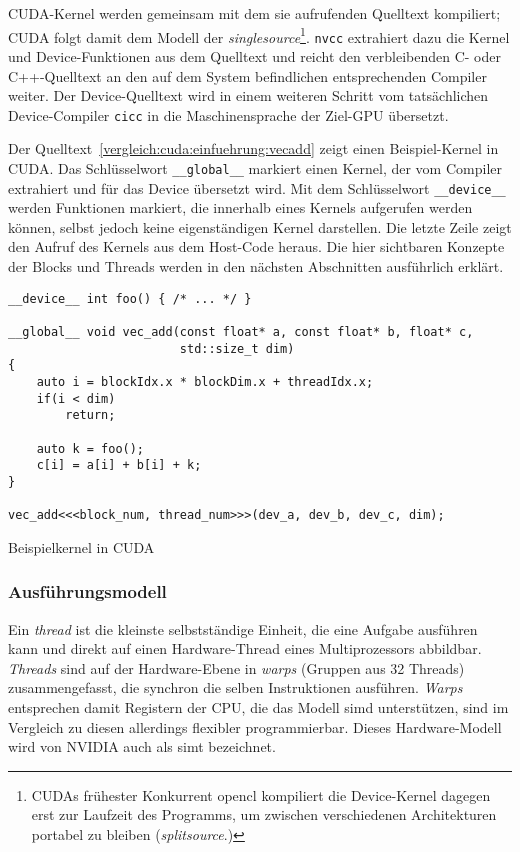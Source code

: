 CUDA-Kernel werden gemeinsam mit dem sie aufrufenden Quelltext kompiliert; CUDA
folgt damit dem Modell der \textit{\gls{singlesource}}\footnote{CUDAs frühester
Konkurrent \gls{opencl} kompiliert die Device-Kernel dagegen erst zur Laufzeit
des Programms, um zwischen verschiedenen Architekturen portabel zu bleiben
(\textit{\gls{splitsource}}.)}. \texttt{nvcc} extrahiert dazu die Kernel und
Device-Funktionen aus dem Quelltext und reicht den verbleibenden C- oder
C++-Quelltext an den auf dem System befindlichen entsprechenden Compiler
weiter. Der Device-Quelltext wird in einem weiteren Schritt vom tatsächlichen
Device-Compiler \texttt{cicc} in die Maschinensprache der Ziel-GPU übersetzt.

Der Quelltext~\ref{vergleich:cuda:einfuehrung:vecadd} zeigt einen
Beispiel-Kernel in CUDA. Das Schlüsselwort \texttt{\_\_global\_\_} markiert
einen Kernel, der vom Compiler extrahiert und für das Device übersetzt wird. Mit
dem Schlüsselwort \texttt{\_\_device\_\_} werden Funktionen markiert, die
innerhalb eines Kernels aufgerufen werden können, selbst jedoch keine
eigenständigen Kernel darstellen. Die letzte Zeile zeigt den Aufruf des Kernels
aus dem Host-Code heraus. Die hier sichtbaren Konzepte der Blocks und Threads
werden in den nächsten Abschnitten ausführlich erklärt.

\begin{code}
    \begin{verbatim}
__device__ int foo() { /* ... */ }

__global__ void vec_add(const float* a, const float* b, float* c,
                        std::size_t dim)
{
    auto i = blockIdx.x * blockDim.x + threadIdx.x;
    if(i < dim)
        return;

    auto k = foo();
    c[i] = a[i] + b[i] + k;
}

vec_add<<<block_num, thread_num>>>(dev_a, dev_b, dev_c, dim);
    \end{verbatim}
    \caption{Beispielkernel in CUDA}
    \label{vergleich:cuda:einfuehrung:vecadd}
\end{code}


\subsubsection{Ausführungsmodell}

Ein \textit{thread} ist die kleinste selbstständige Einheit, die eine Aufgabe
ausführen kann und direkt auf einen Hardware-Thread eines Multiprozessors
abbildbar. \textit{Threads} sind auf der Hardware-Ebene in \textit{warps}
(Gruppen aus 32 Threads) zusammengefasst, die synchron die selben Instruktionen
ausführen. \textit{Warps} entsprechen damit Registern der CPU, die das Modell
\gls{simd} unterstützen, sind im Vergleich zu diesen allerdings flexibler
programmierbar. Dieses Hardware-Modell wird von NVIDIA auch als \gls{simt}
bezeichnet.


